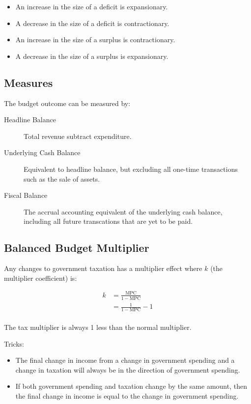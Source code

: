 \documentclass[a4paper,11pt]{report}
\begin{document}
\begin{itemize}
\item An increase in the size of a deficit is expansionary.
\item A decrease in the size of a deficit is contractionary.
\item An increase in the size of a surplus is contractionary.
\item A decrease in the size of a surplus is expansionary.
\end{itemize}

\subsection{Measures}

The budget outcome can be measured by:

\begin{description}
\item [Headline Balance] Total revenue subtract expenditure.
\item [Underlying Cash Balance] Equivalent to headline balance, but excluding
	all one-time transactions such as the sale of assets.
\item [Fiscal Balance] The accrual accounting equivalent of the underlying cash
	balance, including all future transcations that are yet to be paid.
\end{description}

\subsection{Balanced Budget Multiplier}

Any changes to government taxation has a multiplier effect where $k$ (the
multiplier coefficient) is:

$$
\begin{aligned}
k & = \frac{\text{MPC}}{1 - \text{MPC}} \\
& = \frac{1}{1 - \text{MPC}} - 1 \\
\end{aligned}
$$

The tax multiplier is always 1 less than the normal multiplier.

Tricks:

\begin{itemize}
\item The final change in income from a change in government spending and a
	change in taxation will always be in the direction of government spending.
\item If both government spending and taxation change by the same amount, then
	the final change in income is equal to the change in government spending.
\end{itemize}
\end{document}
